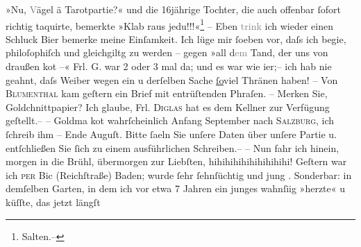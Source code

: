 \begin{ledgroupsized}[t]{13cm}
               »Nu, \textcolor{gray}{V}ägel ä Tarotpartie?« und die 16jährige Tochter, die auch
               offenbar ſofort richtig taquirte, bemerkte »Klab raus jedu!!!«\footnote{\noindent{}Salten.–}\pend
           \pstart
           {\pb}– Eben \textcolor{gray}{trink} ich wieder
               einen Schluck Bier {\kaufmannsund} bemerke meine Einſamkeit. Ich lüge
               mir ſoeben vor, daſs ich begi{\geminationn}e, philoſophiſch und
               gleichgiltg zu werden – gegen »all d\textcolor{gray}{em} Tand, der uns von draußen
                  ko{\geminationm}t –« Frl. G. war 2 oder 3 mal da; und es war wie i{\geminationm}er;–
               ich hab nie geahnt, daſs Weiber wegen ein u derſelben Sache \uline{ſo}{\pb}viel Thränen haben! – Von \textsc{Blumenthal} kam geſtern ein Brief mit entrüſtenden Phraſen. – Merken Sie, Goldchnittpapier?
               Ich glaube, Frl. \textsc{Diglas} hat es dem Kellner zur Verfügung geſtellt.–\pend
           \pstart
           – Goldma{\geminationn} ko{\geminationm}t wahrſcheinlich Anfang September nach \textsc{Salzburg}, ich ſchreib ihm – Ende {\pb}Auguſt. Bitte ſa{\geminationm}eln Sie unſere Daten über
               unſere Partie u. entſchließen Sie ſich zu einem ausführlichen Schreiben.– \pend
           \pstart
           – Nun fahr ich hinein, morgen in die Brühl,
               übermorgen zur Liebſten, hihihihihihihihihihi! {\pb}Geſtern war ich \textsc{per}
               Bic (Reichſtraße) Baden; wurde ſehr ſehnſüchtig
               und jung \label{K_L02960-11v}\label{K_L02960-11h}. Sonderbar: in demſelben Garten, in dem ich vor etwa 7 Jahren ein junges
                  \label{K_L02960-22v}\label{K_L02960-22h} wahnſi{\geminationn}ig »herzte« u küſſte, das jetzt längſt

\end{ledgroupsized}
